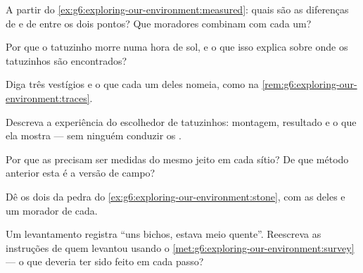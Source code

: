 \begin{exercise}[$\star$]\label{exo:g6:exploring-our-environment:4}
A partir do \cref{ex:g6:exploring-our-environment:measured}: quais
são as diferenças de  e de  entre os dois pontos? Que
moradores combinam com cada um?
\end{exercise}

\begin{exercise}[$\star$]\label{exo:g6:exploring-our-environment:5}
Por que o tatuzinho morre numa hora de sol, e o que isso explica
sobre onde os tatuzinhos são encontrados?
\end{exercise}

\begin{exercise}[$\star$]\label{exo:g6:exploring-our-environment:6}
Diga três vestígios e o  que cada um deles nomeia, como na
\cref{rem:g6:exploring-our-environment:traces}.
\end{exercise}

\begin{exercise}[$\star\star$]\label{exo:g6:exploring-our-environment:7}
Descreva a experiência do escolhedor de tatuzinhos: montagem,
resultado e o que ela mostra --- sem ninguém conduzir os .
\end{exercise}

\begin{exercise}[$\star\star$]\label{exo:g6:exploring-our-environment:8}
Por que as  precisam ser medidas do mesmo jeito em cada
sítio? De que método anterior esta é a versão de campo?
\end{exercise}

\begin{exercise}[$\star\star$]\label{exo:g6:exploring-our-environment:9}
Dê os dois  da pedra do
\cref{ex:g6:exploring-our-environment:stone}, com as  deles
e um morador de cada.
\end{exercise}

\begin{exercise}[$\star\star$]\label{exo:g6:exploring-our-environment:10}
Um levantamento registra ``uns bichos, estava meio quente''. Reescreva
as instruções de quem levantou usando o
\cref{met:g6:exploring-our-environment:survey} --- o que deveria ter
sido feito em cada passo?
\end{exercise}

